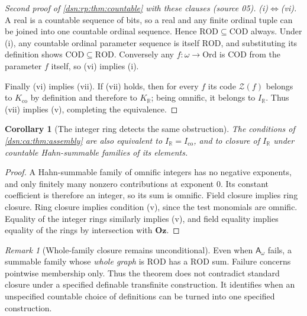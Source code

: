 \documentclass[11pt,a4paper]{article}
\numberwithin{equation}{section}
\newtheorem{corollary}[corollary]{Corollary}
\theoremstyle{definition}
\theoremstyle{remark}
\newtheorem{remark}[remark]{Remark}
\newcommand{\Oz}{\mathbf{Oz}}
\newcommand{\Ord}{\mathrm{Ord}}
\newcommand{\R}{\mathbb R}
\newcommand{\ROD}{\mathrm{ROD}}
\newcommand{\COD}{\mathrm{COD}}
\newcommand{\KR}{K_{\R}}
\newcommand{\IR}{I_{\R}}
\newcommand{\Kco}{K_{\mathrm{co}}}
\newcommand{\Ico}{I_{\mathrm{co}}}
\newcommand{\Asm}{\mathsf A_{\omega}}
\newcommand{\Zc}{\mathcal Z}
\begin{document}
\begin{proof}[Second proof of \cref{dsn:rp:thm:countable} with these clauses (source 05)]
\emph{(i)$\Leftrightarrow$(vi).} A real is a countable sequence of bits,
so a real and any finite ordinal tuple can be joined into one countable
ordinal sequence. Hence $\ROD\subseteq\COD$ always. Under (i), any
countable ordinal parameter sequence is itself $\ROD$, and substituting
its definition shows $\COD\subseteq\ROD$. Conversely any
$f:\omega\to\Ord$ is $\COD$ from the parameter $f$ itself, so (vi)
implies (i).

Finally (vi) implies (vii). If (vii) holds, then for every $f$ its code
$\Zc(f)$ belongs to $\Kco$ by definition and therefore to $\KR$;
being omnific, it belongs to $\IR$. Thus (vii) implies (v), completing
the equivalence.
\end{proof}

\begin{corollary}[The integer ring detects the same obstruction]\label{dsn:ca:cor:ringassembly}
The conditions of \cref{dsn:ca:thm:assembly} are also equivalent to
$\IR=\Ico$, and to closure of $\IR$ under countable Hahn-summable
families of its elements.
\end{corollary}
\begin{proof}
A Hahn-summable family of omnific integers has no negative exponents,
and only finitely many nonzero contributions at exponent $0$. Its
constant coefficient is therefore an integer, so its sum is omnific.
Field closure implies ring closure. Ring closure implies condition
(v), since the test monomials are omnific. Equality of the integer
rings similarly implies (v), and field equality implies equality of
the rings by intersection with $\Oz$.
\end{proof}

\begin{remark}[Whole-family closure remains unconditional]
Even when $\Asm$ fails, a summable family whose \emph{whole graph} is
$\ROD$ has a $\ROD$ sum. Failure concerns pointwise membership only.
Thus the theorem does not contradict standard closure under a specified
definable transfinite construction. It identifies when an unspecified
countable choice of definitions can be turned into one specified
construction.
\end{remark}
\end{document}
